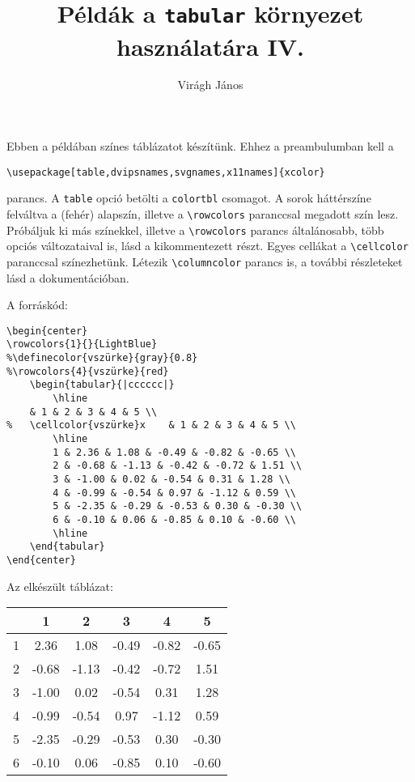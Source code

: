 \documentclass[a4paper]{article}
\author{Virágh János}
\title{Példák a \texttt{tabular} környezet használatára IV.}
\begin{document}
\maketitle	

Ebben a példában színes táblázatot készítünk. Ehhez  a preambulumban kell a

\verb!\usepackage[table,dvipsnames,svgnames,x11names]{xcolor}!

\noindent parancs. A \verb!table! opció betölti a \verb!colortbl! csomagot. A sorok háttérszíne felváltva a (fehér) alapszín, illetve a \verb!\rowcolors! paranccsal megadott szín lesz. Próbáljuk ki más színekkel, illetve a \verb!\rowcolors! parancs általánosabb, több opciós változataival is, lásd a kikommentezett részt. Egyes cellákat a \verb!\cellcolor! paranccsal színezhetünk. Létezik   \verb!\columncolor! parancs is, a további részleteket lásd a dokumentációban.

A forráskód:

\begin{verbatim}
\begin{center}
\rowcolors{1}{}{LightBlue}
%\definecolor{vszürke}{gray}{0.8}
%\rowcolors{4}{vszürke}{red}
	\begin{tabular}{|cccccc|}
		\hline
	& 1 & 2 & 3 & 4 & 5 \\		
%	\cellcolor{vszürke}x	& 1 & 2 & 3 & 4 & 5 \\
		\hline
		1 & 2.36 & 1.08 & -0.49 & -0.82 & -0.65 \\
		2 & -0.68 & -1.13 & -0.42 & -0.72 & 1.51 \\
		3 & -1.00 & 0.02 & -0.54 & 0.31 & 1.28 \\
		4 & -0.99 & -0.54 & 0.97 & -1.12 & 0.59 \\
		5 & -2.35 & -0.29 & -0.53 & 0.30 & -0.30 \\
		6 & -0.10 & 0.06 & -0.85 & 0.10 & -0.60 \\
		\hline
	\end{tabular}
\end{center}
\end{verbatim}

Az elkészült táblázat:

\begin{center}	
	\begin{tabular}{|cccccc|}
		\hline
		& 1 & 2 & 3 & 4 & 5 \\		
		\hline
		1 & 2.36 & 1.08 & -0.49 & -0.82 & -0.65 \\
		2 & -0.68 & -1.13 & -0.42 & -0.72 & 1.51 \\
		3 & -1.00 & 0.02 & -0.54 & 0.31 & 1.28 \\
		4 & -0.99 & -0.54 & 0.97 & -1.12 & 0.59 \\
		5 & -2.35 & -0.29 & -0.53 & 0.30 & -0.30 \\
		6 & -0.10 & 0.06 & -0.85 & 0.10 & -0.60 \\
		\hline
	\end{tabular}	
\end{center}
\end{document}
